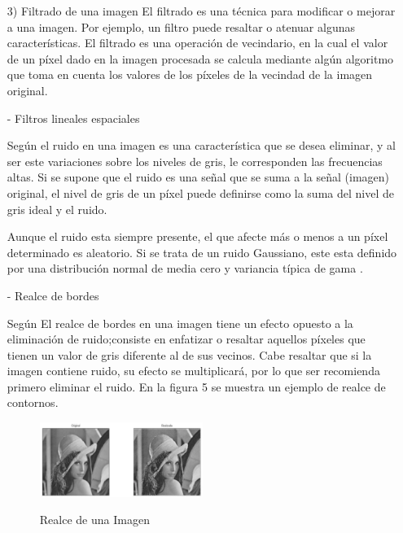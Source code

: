 \documentclass[a4paper, 12pt]{article}
\begin{document}
\begin{enumerate}
\vskip 0.3cm

\item[3)] Filtrado de una imagen
\vskip 0.3cm
El filtrado es una técnica para modificar o mejorar a una imagen. Por ejemplo, un filtro puede resaltar o atenuar algunas características. El filtrado es una operación de vecindario, en la cual el valor de un píxel dado en la imagen procesada se calcula mediante algún algoritmo que toma en cuenta los valores de los píxeles de la vecindad de la imagen original.\citep{elizondo2002fundamentos} \par  
- Filtros lineales espaciales\par
Según \cite{elizondo2002fundamentos} el ruido en una imagen es una característica que se desea eliminar, y al ser este variaciones sobre los niveles de gris, le corresponden las frecuencias  altas. Si se supone que el ruido es una señal que se suma a la señal (imagen) original, el nivel de gris de un píxel puede definirse como la suma del nivel de gris ideal y el ruido.\par
Aunque el ruido esta siempre presente, el que afecte más o menos a un píxel determinado es aleatorio. Si se trata de un ruido Gaussiano, este esta definido por una distribución normal de media cero y variancia típica de gama . \par 
- Realce de bordes\par
Según \cite{elizondo2002fundamentos} El realce de bordes en una imagen tiene un efecto opuesto a la eliminación de ruido;consiste en enfatizar o resaltar aquellos píxeles que tienen un valor de gris diferente al de sus vecinos. Cabe resaltar que si la imagen contiene ruido, su efecto se multiplicará, por
lo que ser recomienda primero eliminar el ruido. En la figura 5 se muestra un ejemplo de realce de contornos.\par

\begin{figure}[ht]
\begin{center}
\includegraphics[width=0.5\textwidth]{realce_bordes}
\end{center}
\begin{center}
\caption{\small{Realce de una Imagen}}
{\small{\cite{elizondo2002fundamentos}}}
\end{center}
\end{figure}
\vskip 0.3cm



\end{enumerate}
\end{document}
